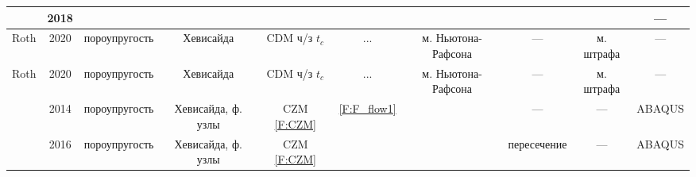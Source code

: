 \begin{landscape}
\begin{table}[h!]
\begin{tabular}{|l|c|c|c|c|c|c|c|c|c|}
		
		\cite{Luo2018}&2018&&&&&&&&---\\
		\hline

		Roth\cite{Roth2020_1}&2020&пороупругость&Хевисайда&CDM ч/з $t_c$&...&м. Ньютона-Рафсона&---&м. штрафа&---\\
		\hline
		Roth\cite{Roth2020_2}&2020&пороупругость&Хевисайда&CDM ч/з $t_c$&...&м. Ньютона-Рафсона&---&м. штрафа&---\\
		\hline

		\cite{Zielonka2014}&2014&пороупругость&Хевисайда, ф. узлы&CZM \eqref{F:CZM}&\eqref{F:F_flow1}&&---&---&ABAQUS\\
		\hline
		\cite{Haddad2016}&2016&пороупругость&Хевисайда, ф. узлы&CZM \eqref{F:CZM}&&&пересечение&---&ABAQUS\\
		\hline
		

		
		
		\hline
	\end{tabular}
	\label{tab:lit_owerview}
\end{table}

\end{landscape}











